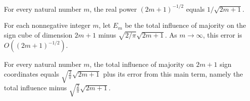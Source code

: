 \begin{theorem}
\label{FABL.oddArity_rpow_neg_one_half}
\leanok
{}
For every natural number $m$, the real power $(2m+1)^{-1/2}$ equals $1/\sqrt{2m+1}$.
\end{theorem}

\begin{theorem}
\label{FABL.oddMajorityTotalInfluenceError_isBigO}
\leanok
{}
For each nonnegative integer $m$, let $E_m$ be the total influence of majority on the
sign cube of dimension $2m+1$ minus $\sqrt{2/\pi}\sqrt{2m+1}$. As $m\to\infty$, this
error is $O((2m+1)^{-1/2})$.
\end{theorem}

\begin{theorem}
\label{FABL.totalInfluence_majority_odd_eq_main_add_error}
\leanok
{}
For every natural number $m$, the total influence of majority on $2m+1$ sign coordinates
equals $\sqrt{\frac{2}{\pi}}\sqrt{2m+1}$ plus its error from this main term, namely the
total influence minus $\sqrt{\frac{2}{\pi}}\sqrt{2m+1}$.
\end{theorem}
